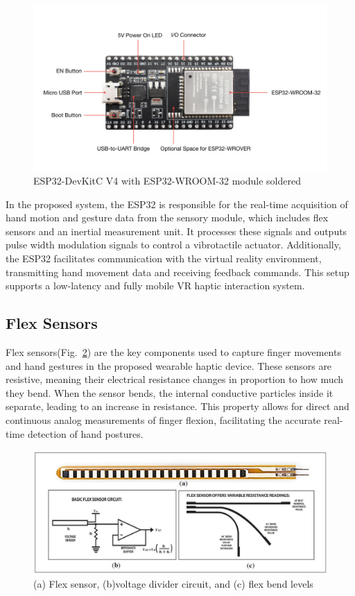 \begin{figure}[H]\centering
	\includegraphics[width=1\textwidth]{Pictures/esp32.jpg}%
	\caption{ESP32-DevKitC V4 with ESP32-WROOM-32 module soldered\cite{esp32docs}}\label{fig:esp32}%
\end{figure}

In the proposed system, the ESP32 is responsible for the real-time acquisition of hand motion and gesture data from the sensory module, which includes flex sensors and an inertial measurement unit. It processes these signals and outputs pulse width modulation signals to control a vibrotactile actuator. Additionally, the ESP32 facilitates communication with the virtual reality environment, transmitting hand movement data and receiving feedback commands. This setup supports a low-latency and fully mobile VR haptic interaction system.

\newpage
\subsection{Flex Sensors}
Flex sensors(Fig.~\ref{fig:flex_sensor}) are the key components used to capture finger movements and hand gestures in the proposed wearable haptic device. These sensors are resistive, meaning their electrical resistance changes in proportion to how much they bend. When the sensor bends, the internal conductive particles inside it separate, leading to an increase in resistance. This property allows for direct and continuous analog measurements of finger flexion, facilitating the accurate real-time detection of hand postures.

\begin{figure}[H]\centering
	\includegraphics[width=1\textwidth]{Pictures/flex_sensor.png}%
	\caption{(a) Flex sensor, (b)voltage divider circuit, and (c) flex bend levels\cite{10.3390/s18072208}}\label{fig:flex_sensor}%
\end{figure}

